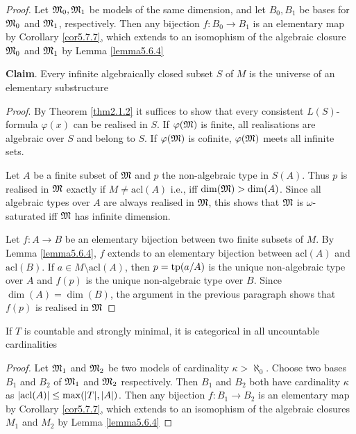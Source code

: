 \documentclass[11pt]{article}
\def \acl {\text{acl}}
\begin{document}
\begin{proof}
Let \(\mathfrak{M}_0,\mathfrak{M}_1\) be models of the same dimension, and let \(B_0,B_1\) be bases for \(\mathfrak{M}_0\)
and \(\mathfrak{M}_1\), respectively. Then any bijection \(f:B_0\to B_1\) is an elementary map by Corollary
\ref{cor5.7.7}, which extends to an isomophism of the algebraic closure \(\mathfrak{M}_0\) and \(\mathfrak{M}_1\) by
Lemma \ref{lemma5.6.4}

\textbf{Claim}. Every infinite algebraically closed subset \(S\) of \(M\) is the universe of an
 elementary substructure

\emph{Proof}. By Theorem \ref{thm2.1.2} it suffices to show that every
consistent \(L(S)\)-formula \(\varphi(x)\) can be realised in \(S\). If \(\varphi(\mathfrak{M})\) is finite, all
realisations are algebraic over \(S\) and belong to \(S\). If \(\varphi(\mathfrak{M})\) is cofinite, \(\varphi(\mathfrak{M})\)
meets all infinite sets.

Let \(A\) be a finite subset of \(\mathfrak{M}\) and \(p\) the non-algebraic type in \(S(A)\).
Thus \(p\) is realised in \(\mathfrak{M}\) exactly if \(M\neq\acl(A)\)
i.e., iff \(\dim(\fM)>\dim(A)\). Since
all algebraic types over \(A\) are always realised in \(\mathfrak{M}\), this shows that \(\mathfrak{M}\) is
\(\omega\)-saturated iff \(\mathfrak{M}\) has infinite dimension.

Let \(f:A\to B\) be an elementary bijection between two finite subsets of \(M\). By Lemma
\ref{lemma5.6.4}, \(f\) extends to an elementary bijection between \(\acl(A)\) and \(\acl(B)\).
If \(a\in M\setminus\acl(A)\), then \(p=\operatorname{tp}(a/A)\) is the unique
non-algebraic type over \(A\)
 and \(f(p)\) is the unique non-algebraic type over \(B\). Since \(\dim(A)=\dim(B)\), the
 argument in the previous paragraph shows that \(f(p)\) is realised in \(\mathfrak{M}\)
\wu{
As \(M\setminus\acl(A)\neq\emptyset\), \(\dim(\fM)>\dim(A)\)
}
\end{proof}

\begin{corollary}[]
If \(T\) is countable and strongly minimal, it is categorical in all uncountable cardinalities
\end{corollary}

\begin{proof}
Let \(\mathfrak{M}_1\) and \(\mathfrak{M}_2\) be two models of cardinality \(\kappa>\aleph_0\). Choose two bases \(B_1\) and \(B_2\)
of \(\mathfrak{M}_1\) and \(\mathfrak{M}_2\) respectively. Then \(B_1\) and \(B_2\) both have cardinality \(\kappa\)
as \(\abs{\acl(A)}\le\max(\abs{T},\abs{A})\). Then any
bijection \(f:B_1\to B_2\) is an elementary map by Corollary \ref{cor5.7.7}, which extends to an
isomophism of the algebraic closures \(M_1\) and \(M_2\) by Lemma \ref{lemma5.6.4}
\end{proof}
\end{document}
